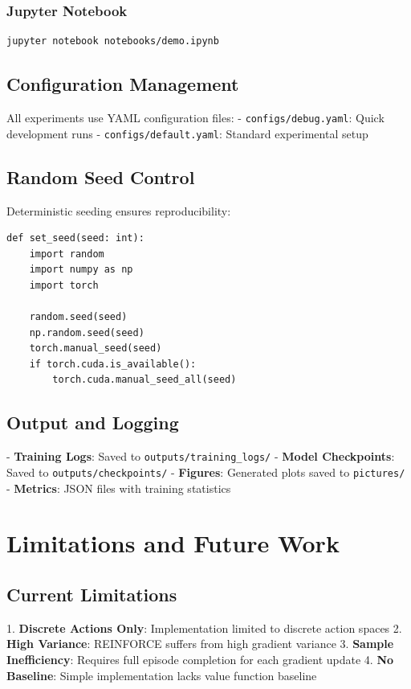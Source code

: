 \documentclass{article}
\begin{document}
\subsubsection{Jupyter Notebook}
\begin{verbatim}
jupyter notebook notebooks/demo.ipynb
\end{verbatim}

\subsection{Configuration Management}

All experiments use YAML configuration files:
- \texttt{configs/debug.yaml}: Quick development runs
- \texttt{configs/default.yaml}: Standard experimental setup

\subsection{Random Seed Control}

Deterministic seeding ensures reproducibility:

\begin{verbatim}
def set_seed(seed: int):
    import random
    import numpy as np
    import torch

    random.seed(seed)
    np.random.seed(seed)
    torch.manual_seed(seed)
    if torch.cuda.is_available():
        torch.cuda.manual_seed_all(seed)
\end{verbatim}

\subsection{Output and Logging}

- \textbf{Training Logs}: Saved to \texttt{outputs/training_logs/}
- \textbf{Model Checkpoints}: Saved to \texttt{outputs/checkpoints/}
- \textbf{Figures}: Generated plots saved to \texttt{pictures/}
- \textbf{Metrics}: JSON files with training statistics

\section{Limitations and Future Work}

\subsection{Current Limitations}

1. \textbf{Discrete Actions Only}: Implementation limited to discrete action spaces
2. \textbf{High Variance}: REINFORCE suffers from high gradient variance
3. \textbf{Sample Inefficiency}: Requires full episode completion for each gradient update
4. \textbf{No Baseline}: Simple implementation lacks value function baseline
\end{document}
